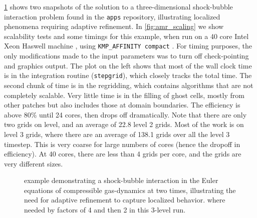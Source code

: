 \cref{fig:shockbubble} shows two snapshots of the solution to a
three-dimensional shock-bubble interaction problem found in the \clawpack
\texttt{apps} repository, illustrating localized phenomena requiring adaptive
refinement. In \cref{fig:amr_scaling} we show scalability tests and some timings
for this example, when run on a 40 core Intel Xeon Haswell machine 
, using
\texttt{KMP\_AFFINITY compact} .
For timing purposes, the only modifications made to the input parameters was to
turn off check-pointing and graphics output. The plot on the left shows that most
of the wall clock time is in the integration routine (\texttt{stepgrid}), which
closely tracks the total time. The second chunk of time is in the regridding,
which contains algorithms that are not completely scalable. Very little time is
in the filling of ghost cells, mostly from other patches but also includes those
at domain boundaries. The efficiency is above 80\% until 24 cores, then drops
off dramatically. Note that there are only two grids on level, and an average of
22.8 level 2 grids. Most of the work is on level 3 grids, where there are an
average of 138.1 grids over all the level 3 timestep.  This is very coarse for
large numbers of cores (hence the dropoff in efficiency). At 40 cores, there are
less than 4 grids per core, and the grids are very different sizes.

\begin{figure}[t]
  \begin{center}
    \hfil
  \end{center}
\caption{\amrclaw example demonstrating a
  shock-bubble interaction in the Euler equations of compressible
  gas-dynamics at two times, illustrating the need for adaptive refinement
  to capture localized behavior.  where needed
  by factors of 4 and then 2 in this 3-level run.}
\label{fig:shockbubble}
\end{figure}

